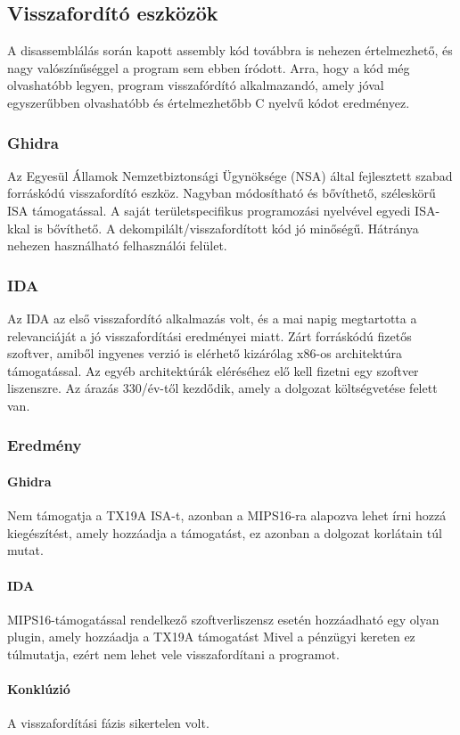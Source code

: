 \subsection{Visszafordító eszközök}
A disassemblálás során kapott assembly kód továbbra is nehezen értelmezhető, és nagy valószínűséggel a program sem ebben íródott.
Arra, hogy a kód még olvashatóbb legyen, program visszafórdító alkalmazandó, amely jóval egyszerűbben olvashatóbb és értelmezhetőbb C nyelvű kódot eredményez. 

\subsubsection{Ghidra}
Az Egyesül Államok Nemzetbiztonsági Ügynöksége (NSA) által fejlesztett szabad forráskódú visszafordító eszköz.
Nagyban módosítható és bővíthető, széleskörű ISA támogatással.
A saját területspecifikus programozási nyelvével egyedi ISA-kkal is bővíthető.
A dekompilált/visszafordított kód jó minőségű.
Hátránya nehezen használható felhasználói felület.

\subsubsection{IDA}
Az IDA az első visszafordító alkalmazás volt, és a mai napig megtartotta a relevanciáját a jó visszafordítási eredményei miatt.
Zárt forráskódú fizetős szoftver, amiből ingyenes verzió is elérhető kizárólag x86-os architektúra támogatással.
Az egyéb architektúrák eléréséhez elő kell fizetni egy szoftver liszenszre.
Az árazás 330\texteuro/év-től kezdődik, amely a dolgozat költségvetése felett van.

\subsubsection{Eredmény}
\paragraph{Ghidra}
Nem támogatja a TX19A ISA-t, azonban a MIPS16-ra alapozva lehet írni hozzá kiegészítést, amely hozzáadja a támogatást, ez azonban a dolgozat korlátain túl mutat.
\paragraph{IDA}
MIPS16-támogatással rendelkező szoftverliszensz esetén hozzáadható egy olyan plugin, amely hozzáadja a TX19A támogatást
Mivel a pénzügyi kereten ez túlmutatja, ezért nem lehet vele visszafordítani a programot.

\paragraph{Konklúzió}A visszafordítási fázis sikertelen volt.


